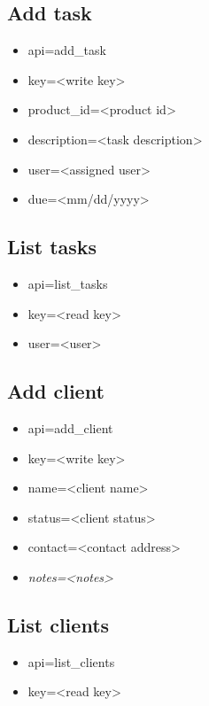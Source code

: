 \documentclass[11pt]{article}
\begin{document}
\subsection{Add task}

\begin{itemize}
\item api=add\_task
\item key=<write key>
\item product\_id=<product id>
\item description=<task description>
\item user=<assigned user>
\item due=<mm/dd/yyyy>
\end{itemize}

\subsection{List tasks}

\begin{itemize}
\item api=list\_tasks
\item key=<read key>
\item user=<user>
\end{itemize}

\subsection{Add client}

\begin{itemize}
\item api=add\_client
\item key=<write key>
\item name=<client name>
\item status=<client status>
\item contact=<contact address>
\item \textit{notes=<notes>}
\end{itemize}

\subsection{List clients}

\begin{itemize}
\item api=list\_clients
\item key=<read key>
\end{itemize}
\end{document}
